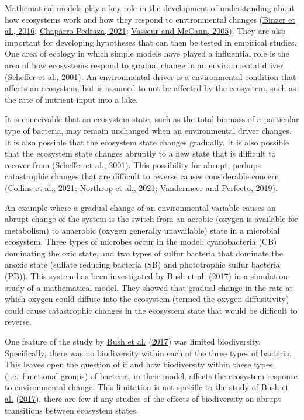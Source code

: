 \documentclass[]{elsarticle} %
\begin{document}
Mathematical models play a key role in the development of understanding
about how ecosystems work and how they respond to environmental changes
(\protect\hyperlink{ref-Binzer2016a}{Binzer et al., 2016};
\protect\hyperlink{ref-Chaparro-Pedraza2021}{Chaparro-Pedraza, 2021};
\protect\hyperlink{ref-Vasseur2005}{Vasseur and McCann, 2005}). They are
also important for developing hypotheses that can then be tested in
empirical studies. One area of ecology in which simple models have
played a influential role is the area of how ecosystems respond to
gradual change in an environmental driver
(\protect\hyperlink{ref-Scheffer2001}{Scheffer et al., 2001}). An
environmental driver is a environmental condition that affects an
ecosystem, but is assumed to not be affected by the ecosystem, such as
the rate of nutrient input into a lake.

It is conceivable that an ecosystem state, such as the total biomass of
a particular type of bacteria, may remain unchanged when an
environmental driver changes. It is also possible that the ecosystem
state changes gradually. It is also possible that the ecosystem state
changes abruptly to a new state that is difficult to recover from
(\protect\hyperlink{ref-Scheffer2001}{Scheffer et al., 2001}). This
possibility for abrupt, perhaps catastrophic changes that are difficult
to reverse causes considerable concern
(\protect\hyperlink{ref-Collins2021}{Collins et al., 2021};
\protect\hyperlink{ref-Northrop2021}{Northrop et al., 2021};
\protect\hyperlink{ref-Vandermeer2019}{Vandermeer and Perfecto, 2019}).

An example where a gradual change of an environmental variable causes an
abrupt change of the system is the switch from an aerobic (oxygen is
available for metabolism) to anaerobic (oxygen generally unavailable)
state in a microbial ecosystem. Three types of microbes occur in the
model: cyanobacteria (CB) dominating the oxic state, and two types of
sulfur bacteria that dominate the anoxic state (sulfate reducing
bacteria (SB) and phototrophic sulfur bacteria (PB)). This system has
been investigated by \protect\hyperlink{ref-Bush2017}{Bush et al.}
(\protect\hyperlink{ref-Bush2017}{2017}) in a simulation study of a
mathematical model. They showed that gradual change in the rate at which
oxygen could diffuse into the ecosystem (termed the oxygen
diffusitivity) could cause catastrophic changes in the ecosystem state
that would be difficult to reverse.

One feature of the study by \protect\hyperlink{ref-Bush2017}{Bush et
al.} (\protect\hyperlink{ref-Bush2017}{2017}) was limited biodiversity.
Specifically, there was no biodiversity within each of the three types
of bacteria. This leaves open the question of if and how biodiversity
within these types (i.e.~functional groups) of bacteria, in their model,
affects the ecosystem response to environmental change. This limitation
is not specific to the study of \protect\hyperlink{ref-Bush2017}{Bush et
al.} (\protect\hyperlink{ref-Bush2017}{2017}), there are few if any
studies of the effects of biodiversity on abrupt transitions between
ecosystem states.
\end{document}
